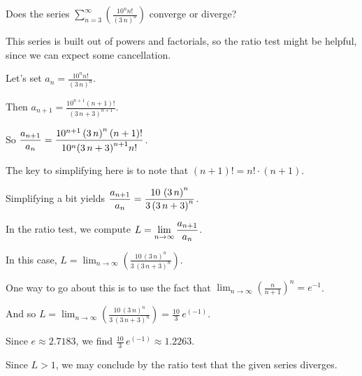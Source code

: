 \documentclass{ximera}
\begin{document}
\begin{question}
  Does the series \(\displaystyle\sum_{n=3}^\infty \left( \displaystyle\frac{10^{n} n!}{\left(3 \, n\right)^{n}} \right)\) converge or diverge?

  \begin{solution}
    \begin{hint}
      This series is built out of powers and factorials, so the ratio test might be helpful, since we can expect some cancellation.
    \end{hint}
    \begin{hint}
      Let's set \(a_n = \displaystyle\frac{10^{n} n!}{\left(3 \, n\right)^{n}}\).
    \end{hint}
    \begin{hint}
      Then \(a_{n+1} = \displaystyle\frac{10^{n + 1} \left(n + 1\right)!}{{\left(3 \, n + 3\right)}^{n + 1}}\).
    \end{hint}
    \begin{hint}
      So \(\displaystyle\displaystyle\frac{a_{n+1}}{a_n} = \displaystyle\frac{10^{n + 1} \left(3 \, n\right)^{n} \left(n + 1\right)!}{10^{n} {\left(3 \, n + 3\right)}^{n + 1} n!}\).
    \end{hint}
    \begin{hint}
      The key to simplifying here is to note that \(\left(n + 1\right)! = n! \cdot (n + 1)\).
    \end{hint}
    \begin{hint}
      Simplifying a bit yields \(\displaystyle\displaystyle\frac{a_{n+1}}{a_n} = \displaystyle\frac{10 \, \left(3 \, n\right)^{n}}{3 \, {\left(3 \, n + 3\right)}^{n}}\).
    \end{hint}
    \begin{hint}
      In the ratio test, we compute \(L = \displaystyle\lim_{n \to \infty} \displaystyle\displaystyle\frac{a_{n+1}}{a_n}\).
    \end{hint}
    \begin{hint}
      In this case, \(L = \displaystyle\lim_{n \to \infty} \left( \displaystyle\frac{10 \, \left(3 \, n\right)^{n}}{3 \, {\left(3 \, n + 3\right)}^{n}} \right)\).
    \end{hint}
    \begin{hint}
      One way to go about this is to use the fact that \(\displaystyle\lim_{n \to \infty} \left( \displaystyle\frac{n}{n + 1} \right)^{n} = e^{-1}\).
    \end{hint}
    \begin{hint}
      And so \(L = \displaystyle\lim_{n \to \infty} \left( \displaystyle\frac{10 \, \left(3 \, n\right)^{n}}{3 \, {\left(3 \, n + 3\right)}^{n}} \right) = \displaystyle\frac{10}{3} \, e^{\left(-1\right)}\).
    \end{hint}
    \begin{hint}
      Since \(e \approx 2.7183\), we find \(\displaystyle\frac{10}{3} \, e^{\left(-1\right)} \approx 1.2263\).
    \end{hint}
    \begin{hint}
      Since \(L > 1\), we may conclude by the ratio test that the given series diverges.
    \end{hint}


\end{solution}
\end{question}
\end{document}
